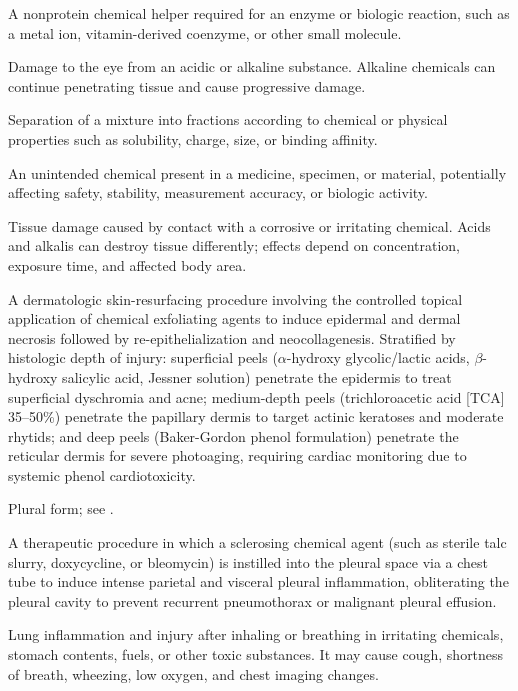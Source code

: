  A nonprotein chemical helper required for an enzyme or biologic reaction, such as a metal ion, vitamin-derived coenzyme, or other small molecule.

 Damage to the eye from an acidic or alkaline substance. Alkaline chemicals can continue penetrating tissue and cause progressive damage.

 Separation of a mixture into fractions according to chemical or physical properties such as solubility, charge, size, or binding affinity.

 An unintended chemical present in a medicine, specimen, or material, potentially affecting safety, stability, measurement accuracy, or biologic activity.

 Tissue damage caused by contact with a corrosive or irritating chemical. Acids and alkalis can destroy tissue differently; effects depend on concentration, exposure time, and affected body area.

 A dermatologic skin-resurfacing procedure involving the controlled topical application of chemical exfoliating agents to induce epidermal and dermal necrosis followed by re-epithelialization and neocollagenesis. Stratified by histologic depth of injury: superficial peels ($\alpha$-hydroxy glycolic/lactic acids, $\beta$-hydroxy salicylic acid, Jessner solution) penetrate the epidermis to treat superficial dyschromia and acne; medium-depth peels (trichloroacetic acid [TCA] 35--50\%) penetrate the papillary dermis to target actinic keratoses and moderate rhytids; and deep peels (Baker-Gordon phenol formulation) penetrate the reticular dermis for severe photoaging, requiring cardiac monitoring due to systemic phenol cardiotoxicity.

 Plural form; see .

 A therapeutic procedure in which a sclerosing chemical agent (such as sterile talc slurry, doxycycline, or bleomycin) is instilled into the pleural space via a chest tube to induce intense parietal and visceral pleural inflammation, obliterating the pleural cavity to prevent recurrent pneumothorax or malignant pleural effusion.

 Lung inflammation and injury after inhaling or breathing in irritating chemicals, stomach contents, fuels, or other toxic substances. It may cause cough, shortness of breath, wheezing, low oxygen, and chest imaging changes.

